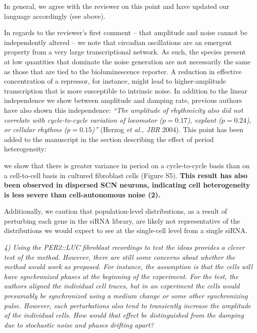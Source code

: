\documentclass[11pt, letterpaper]{article}
\newenvironment{reviewer}{\itshape\color{gray}}{}
\newenvironment{manuscript}[1]{\begin{center}\begin{tcolorbox}[colback=green!5!white,colframe=green!75!black,width=\textwidth,title={#1},breakable,fonttitle=\bfseries]}{\end{tcolorbox}\end{center}}
\begin{document}
In general, we agree with the reviewer on this point and have updated our language accordingly (see above).

In regards to the reviewer's first comment -- that amplitude and noise cannot be independently altered -- we note that circadian oscillations are an emergent property from a very large transcriptional network.
As such, the species present at low quantities that dominate the noise generation are not necessarily the same as those that are tied to the bioluminescence reporter.
A reduction in effective concentration of a repressor, for instance, might lead to higher-amplitude transcription that is more susceptible to intrinsic noise.
In addition to the linear independence we show between amplitude and damping rate, previous authors have also shown this independence: {\itshape ``The amplitude of rhythmicity also did not correlate with cycle-to-cycle variation of locomotor ($p = 0.17$), explant ($p = 0.24$), or cellular rhythms ($p = 0.15$)''} (Herzog {\itshape et al., JBR} 2004).
This point has been added to the manuscript in the section describing the effect of period heterogeneity:

\begin{manuscript}{Page 8}
 we show that there is greater variance in period on a cycle-to-cycle basis than on a cell-to-cell basis in cultured fibroblast cells (Figure S5). {\bfseries This result has also been observed in dispersed SCN neurons, indicating cell heterogeneity is less severe than cell-autonomous noise (2).}
\end{manuscript}

Additionally, we caution that population-level distributions, as a result of perturbing each gene in the siRNA library, are likely not representative of the distributions we would expect to see at the single-cell level from a single siRNA.



\begin{reviewer}
4) Using the PER2::LUC fibroblast recordings to test the ideas provides a clever test of the method. However, there are still some concerns about whether the method would work as proposed. For instance, the assumption is that the cells will have synchronized phases at the beginning of the experiment. For the test, the authors aligned the individual cell traces, but in an experiment the cells would presumably be synchronized using a medium change or some other synchronizing pulse. However, such perturbations also tend to transiently increase the amplitude of the individual cells. How would that effect be distinguished from the damping due to stochastic noise and phases drifting apart?
\end{reviewer}
\end{document}
